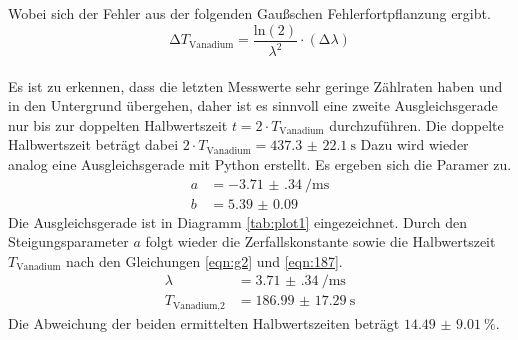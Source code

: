 Wobei sich der Fehler aus der folgenden Gaußschen Fehlerfortpflanzung ergibt.
\begin{equation}
\increment T_{\text{Vanadium}} = \frac{\text{ln}(2)}{\lambda^{2}} \cdot (\increment \lambda)
\end{equation}
\\
\newline
Es ist zu erkennen, dass die letzten Messwerte sehr geringe Zählraten haben und in den Untergrund übergehen, daher ist es sinnvoll eine zweite Ausgleichsgerade
nur bis zur doppelten Halbwertszeit $t = 2 \cdot T_{\text{Vanadium}}$ durchzuführen.
Die doppelte Halbwertszeit beträgt dabei $2 \cdot T_{\text{Vanadium}} = \SI{437.3(221)}{\second}$
Dazu wird wieder analog eine Ausgleichsgerade mit Python erstellt.
Es ergeben sich die Paramer zu.
\begin{align*}
a &= \SI{-3.71(34)}{\per\milli\second} \\
b &= \SI{5.39(9)}{}
\end{align*}
Die Ausgleichsgerade ist in Diagramm \ref{tab:plot1} eingezeichnet.
Durch den Steigungsparameter $a$ folgt wieder die Zerfallskonstante sowie die Halbwertszeit $T_{\text{Vanadium}}$ nach den Gleichungen \eqref{eqn:g2} und \eqref{eqn:187}.
\begin{align}
\lambda &= \SI{3.71(34)}{\per\milli\second} \\
T_{\text{Vanadium,2}} &=  \SI{186.99(1729)}{\second}
\end{align}
Die Abweichung der beiden ermittelten Halbwertszeiten beträgt $\SI{14.49(901)}{\percent}$.
